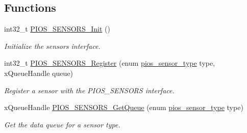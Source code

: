 \subsection*{\-Functions}
\begin{DoxyCompactItemize}
\item 
int32\-\_\-t \hyperlink{group___p_i_o_s___s_e_n_s_o_r_s_ga382f3e734c0289835d99e3a8410a28bd}{\-P\-I\-O\-S\-\_\-\-S\-E\-N\-S\-O\-R\-S\-\_\-\-Init} ()
\begin{DoxyCompactList}\small\item\em \-Initialize the sensors interface. \end{DoxyCompactList}\item 
int32\-\_\-t \hyperlink{group___p_i_o_s___s_e_n_s_o_r_s_gadd19368ecca5b7d027ce475e3677692b}{\-P\-I\-O\-S\-\_\-\-S\-E\-N\-S\-O\-R\-S\-\_\-\-Register} (enum \hyperlink{group___p_i_o_s___s_e_n_s_o_r_s_gadad1b67d985a6c9c150a70d23aac96a0}{pios\-\_\-sensor\-\_\-type} type, x\-Queue\-Handle queue)
\begin{DoxyCompactList}\small\item\em \-Register a sensor with the \-P\-I\-O\-S\-\_\-\-S\-E\-N\-S\-O\-R\-S interface. \end{DoxyCompactList}\item 
x\-Queue\-Handle \hyperlink{group___p_i_o_s___s_e_n_s_o_r_s_gaec312826a58f6c29ef0a00f56e37cfbc}{\-P\-I\-O\-S\-\_\-\-S\-E\-N\-S\-O\-R\-S\-\_\-\-Get\-Queue} (enum \hyperlink{group___p_i_o_s___s_e_n_s_o_r_s_gadad1b67d985a6c9c150a70d23aac96a0}{pios\-\_\-sensor\-\_\-type} type)
\begin{DoxyCompactList}\small\item\em \-Get the data queue for a sensor type. \end{DoxyCompactList}\end{DoxyCompactItemize}
